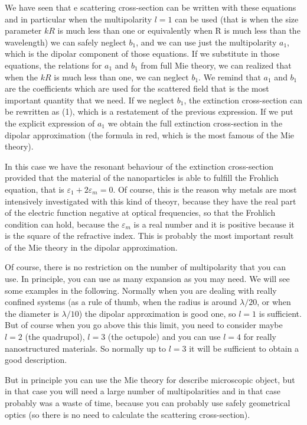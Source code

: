 \documentclass[../main/main.tex]{subfiles}
\begin{document}
We have seen that e scattering cross-section can be written with these equations and in particular when the multipolarity $l=1$ can be used (that is when the size parameter \( k R \) is much less than one or equivalently when R is much less than the wavelength) we can safely neglect $b_1$, and we can use just the multipolarity \( a_1 \), which is the dipolar component of those equations.
If we substitute in those equations, the relations for \( a_1 \) and \( b_1 \) from full Mie theory, we can realized that when the \( k R \) is much less than one, we can neglect \( b_1 \).
We remind that \( a_1 \) and \( b_1 \) are the coefficients which are used for the scattered field that is the most important quantity that we need.
If we neglect \( b_1 \), the extinction cross-section can be rewritten as (1), which is a restatement of the previous expression. If we put the explicit expression of $a_1$ we obtain the full extinction cross-section in the dipolar approximation (the formula in red, which is the most famous of the Mie theory).


In this case we have the resonant behaviour of the extinction cross-section provided that the material of the nanoparticles is able to fulfill the Frohlich equation, that is \( \varepsilon _1 + 2 \varepsilon _m =0 \).
Of course, this is the reason why metals are most intensively investigated with this kind of theoyr, because they have the real part of the electric function negative at optical frequencies, so that the Frohlich condition can hold,
because the \( \varepsilon _m  \) is a real number and it is positive because it is the square of the refractive index.
This is probably the most important result of the Mie theory in the dipolar approximation.

Of course, there is no restriction on the number of multipolarity that you can use.
In principle, you can use as many expansion as you may need. We will see some examples in the following.
Normally when you are dealing with really confined systems (as a rule of thumb, when the radius is around $\lambda/20$, or when the diameter is \( \lambda/10 \)) the dipolar approximation is good one, so \( l=1 \) is sufficient.
But of course when you go above this this limit, you need to consider maybe $l=2$ (the quadrupol), \( l=3 \) (the octupole) and you can use \( l=4 \) for really nanostructured materials.
So normally up to \( l=3 \) it will be sufficient to obtain a good description.

But in principle you can use the Mie theory for describe microscopic object, but in that case you will need a large number of multipolarities and in that case probably was a waste of time, because you can probably use safely geometrical optics (so there is no need to calculate the scattering cross-section).
\end{document}
